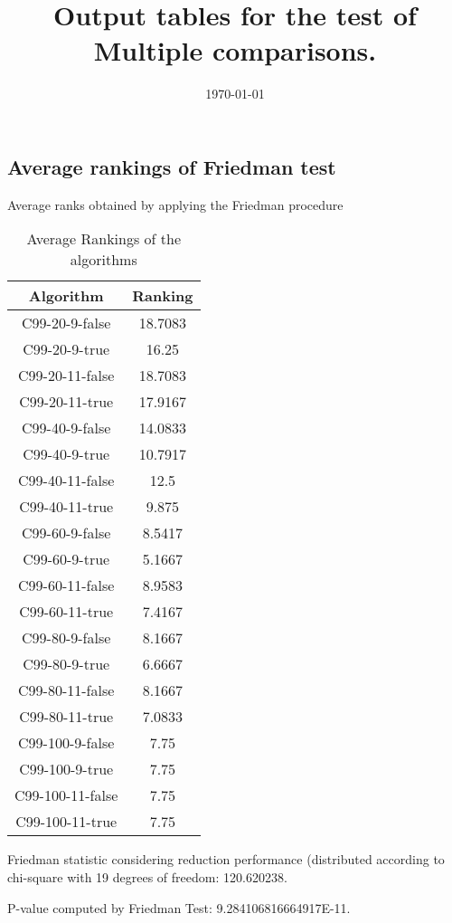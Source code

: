 \documentclass[a4paper,10pt]{article}
\title{Output tables for the test of Multiple comparisons.}
\author{}
\date{\today}
\begin{document}
\begin{landscape}
\pagestyle{empty}
\maketitle
\thispagestyle{empty}
\section{Average rankings of Friedman test}



Average ranks obtained by applying the Friedman procedure

\begin{table}[!htp]
\centering
\begin{tabular}{|c|c|}\hline
Algorithm&Ranking\\\hline
C99-20-9-false & 18.7083\\
C99-20-9-true & 16.25\\
C99-20-11-false & 18.7083\\
C99-20-11-true & 17.9167\\
C99-40-9-false & 14.0833\\
C99-40-9-true & 10.7917\\
C99-40-11-false & 12.5\\
C99-40-11-true & 9.875\\
C99-60-9-false & 8.5417\\
C99-60-9-true & 5.1667\\
C99-60-11-false & 8.9583\\
C99-60-11-true & 7.4167\\
C99-80-9-false & 8.1667\\
C99-80-9-true & 6.6667\\
C99-80-11-false & 8.1667\\
C99-80-11-true & 7.0833\\
C99-100-9-false & 7.75\\
C99-100-9-true & 7.75\\
C99-100-11-false & 7.75\\
C99-100-11-true & 7.75\\
\hline
\end{tabular}
\caption{Average Rankings of the algorithms}
\end{table}

Friedman statistic considering reduction performance (distributed according to chi-square with 19 degrees of freedom: 120.620238.

P-value computed by Friedman Test: 9.284106816664917E-11.\newline




\end{landscape}
\end{document}
